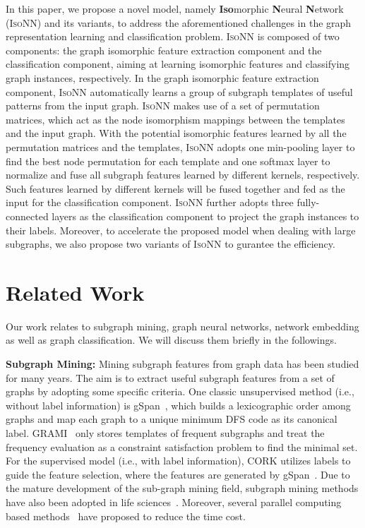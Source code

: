 \documentclass{article} \usepackage{iclr2020_conference,times}
\newcommand{\our}{\textsc{IsoNN}}
\begin{document}
In this paper, we propose a novel model, namely  \textbf{Iso}morphic \textbf{N}eural \textbf{N}etwork ({\our}) and its variants, to address the aforementioned challenges in the graph representation learning and classification problem. {\our} is composed of two components: the graph isomorphic feature extraction component and the classification component, aiming at learning isomorphic features and classifying graph instances, respectively. In the graph isomorphic feature extraction component, {\our} automatically learns a group of subgraph templates of useful patterns from the input graph. {\our} makes use of a set of permutation matrices, which act as the node isomorphism mappings between the templates and the input graph. With the potential isomorphic features learned by all the permutation matrices and the templates, {\our} adopts one min-pooling layer to find the best node permutation for each template and one softmax layer to normalize and fuse all subgraph features learned by different kernels, respectively. Such features learned by different kernels will be fused together and fed as the input for the classification component. {\our} further adopts three fully-connected layers as the classification component to project the graph instances to their labels. Moreover, to accelerate the proposed model when dealing with large subgraphs, we also propose two variants of {\our} to gurantee the efficiency. 






%
 
\vspace*{-10pt}
\section{Related Work} \label{sec:related_work}
\vspace*{-10pt}
Our work relates to subgraph mining, graph neural networks, network embedding as well as graph classification. We will discuss them briefly in the followings.

\textbf{Subgraph Mining:} Mining subgraph features from graph data has been studied for many years. The aim is to extract useful subgraph features from a set of graphs by adopting some specific criteria. One classic unsupervised method (i.e., without label information) is gSpan~\citep{yan2002gspan}, which builds a lexicographic order among graphs and map each graph to a unique minimum DFS code as its canonical label. GRAMI~\citep{elseidy2014grami} only stores templates of frequent subgraphs and treat the frequency evaluation as a constraint satisfaction problem to find the minimal set. For the supervised model (i.e., with label information), CORK utilizes labels to guide the feature selection, where the features are generated by gSpan~\citep{thoma2009near}. Due to the mature development of the sub-graph mining field,  subgraph mining methods have also been adopted in life sciences~\citep{mrzic2018grasping}. Moreover, several parallel computing based methods~\citep{qiao2018parallel, hill2012iterative, lin2014large} have proposed to reduce the time cost. 
\end{document}
